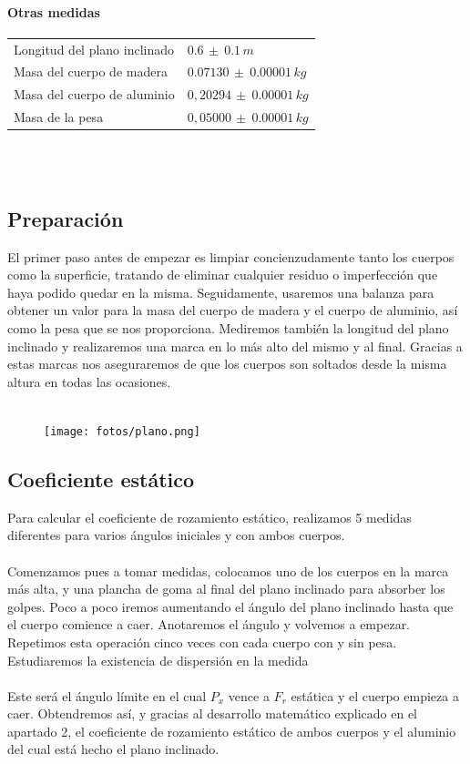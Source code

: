 \documentclass{article}
\begin{document}
\paragraph{Otras medidas}\mbox{}
    \begin{tabular}{ll}
        Longitud del plano inclinado& $0.6\,\pm\  0.1\,m$\\
        Masa del cuerpo de madera&
        $0.07130\,\pm\ 0.00001\,kg$\\
        Masa del cuerpo de aluminio&
        $0,20294\, \pm\ 0.00001\,kg$\\
        Masa de la pesa&
        $0,05000\, \pm\ 0.00001\,kg$
    \end{tabular}\\\\

\subsection{Preparación}
El primer paso antes de empezar es limpiar concienzudamente tanto los cuerpos como la superficie, tratando de eliminar cualquier residuo o imperfección que haya podido quedar en la misma. Seguidamente, usaremos una balanza para obtener un valor para la masa del cuerpo de madera y el cuerpo de aluminio, así como la pesa que se nos proporciona. Mediremos también la longitud del plano inclinado y realizaremos una marca en lo más alto del mismo y al final. Gracias a estas marcas nos aseguraremos de que los cuerpos son soltados desde la misma altura en todas las ocasiones.\\\\

\begin{figure}[h]
\centering
\texttt{[image: fotos/plano.png]}
\end{figure}

\clearpage
\subsection{Coeficiente estático}
Para calcular el coeficiente de rozamiento estático, realizamos 5 medidas diferentes para varios ángulos iniciales y con ambos cuerpos. \\\\ 
Comenzamos pues a tomar medidas, colocamos uno de los cuerpos en la marca más alta, y una plancha de goma al final del plano inclinado para absorber los golpes. Poco a poco iremos aumentando el ángulo del plano inclinado hasta que el cuerpo comience a caer. Anotaremos el ángulo y volvemos a empezar. Repetimos esta operación cinco veces con cada cuerpo con y sin pesa. Estudiaremos la existencia de dispersión en la medida \\\\ Este será el ángulo límite en el cual $P_x$ vence a $F_r$ estática y el cuerpo empieza a caer. Obtendremos así, y gracias al desarrollo matemático explicado en el apartado 2, el coeficiente de rozamiento estático de ambos cuerpos y el aluminio del cual está hecho el plano inclinado.\\\\
\end{document}
